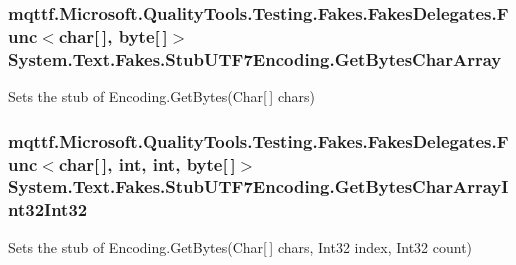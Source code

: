 \hypertarget{class_system_1_1_text_1_1_fakes_1_1_stub_u_t_f7_encoding_a095171488646123fc66e3c721ea0a384}{
\subsubsection[{Get\-Bytes\-Char\-Array}]{\setlength{\rightskip}{0pt plus 5cm}mqttf.\-Microsoft.\-Quality\-Tools.\-Testing.\-Fakes.\-Fakes\-Delegates.\-Func$<$char\mbox{[}$\,$\mbox{]}, byte\mbox{[}$\,$\mbox{]}$>$ System.\-Text.\-Fakes.\-Stub\-U\-T\-F7\-Encoding.\-Get\-Bytes\-Char\-Array}}\label{class_system_1_1_text_1_1_fakes_1_1_stub_u_t_f7_encoding_a095171488646123fc66e3c721ea0a384}


Sets the stub of Encoding.\-Get\-Bytes(\-Char\mbox{[}$\,$\mbox{]} chars)

\hypertarget{class_system_1_1_text_1_1_fakes_1_1_stub_u_t_f7_encoding_a170017e7137fe6167503854dedbe95fc}{
\subsubsection[{Get\-Bytes\-Char\-Array\-Int32\-Int32}]{\setlength{\rightskip}{0pt plus 5cm}mqttf.\-Microsoft.\-Quality\-Tools.\-Testing.\-Fakes.\-Fakes\-Delegates.\-Func$<$char\mbox{[}$\,$\mbox{]}, int, int, byte\mbox{[}$\,$\mbox{]}$>$ System.\-Text.\-Fakes.\-Stub\-U\-T\-F7\-Encoding.\-Get\-Bytes\-Char\-Array\-Int32\-Int32}}\label{class_system_1_1_text_1_1_fakes_1_1_stub_u_t_f7_encoding_a170017e7137fe6167503854dedbe95fc}


Sets the stub of Encoding.\-Get\-Bytes(\-Char\mbox{[}$\,$\mbox{]} chars, Int32 index, Int32 count)

